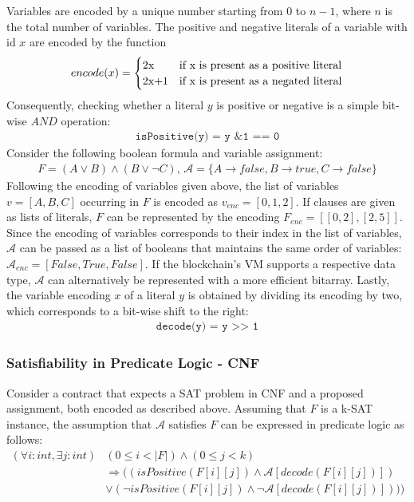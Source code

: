 Variables are encoded by a unique number starting from $0$ to $n-1$, where $n$ is the total number of variables. The positive and negative literals of a variable with id $x$ are encoded by the function
\begin{align*}
encode(x) =
\begin{cases}
  $2x$  & \text{if x is present as a positive literal}\\
  $2x+1$ & \text{if x is present as a negated literal}\\
\end{cases}   
\end{align*}
Consequently, checking whether a literal $y$ is positive or negative is a simple bit-wise $AND$ operation:
\begin{align*}
\texttt{isPositive(y) = y \& 1 == 0}
\end{align*}
Consider the following boolean formula and variable assignment:
\begin{align*}
F = (A \vee B) \wedge (B \vee \neg C) \text{, } \mathcal{A} = \{A \rightarrow false, B \rightarrow true, C \rightarrow false\}
\end{align*}
Following the encoding of variables given above, the list of variables $v=[A,B,C]$ occurring in $F$ is encoded as $v_{enc} = [0,1,2]$. If clauses are given as lists of literals, $F$ can be represented by the encoding $F_{enc} = [[0,2],[2,5]]$. Since the encoding of variables corresponds to their index in the list of variables, $\mathcal{A}$ can be passed as a list of booleans that maintains the same order of variables: $\mathcal{A}_{enc} = [False, True, False]$. If the blockchain's VM supports a respective data type, $\mathcal{A}$ can alternatively be represented with a more efficient bitarray. Lastly, the variable encoding $x$ of a literal $y$ is obtained by dividing its encoding by two, which corresponds to a bit-wise shift to the right:
\begin{align*}
\texttt{decode(y) = y >> 1}
\end{align*}

\subsubsection{Satisfiability in Predicate Logic - CNF}
Consider a contract that expects a SAT problem in CNF and a proposed assignment, both encoded as described above. Assuming that $F$ is a k-SAT instance, the assumption that $\mathcal{A}$ satisfies $F$ can be expressed in predicate logic as follows:
\begin{equation}\label{eq:cnf_sat}
\begin{aligned}
(\forall i : int, \exists j : int) &(0 \leq i < |F|) \wedge (0 \leq j < k) \\
&\Rightarrow ((isPositive(F[i][j]) \wedge \mathcal{A}[decode(F[i][j])]) \\
&\vee (\neg isPositive(F[i][j]) \wedge \neg \mathcal{A}[decode(F[i][j])])))
\end{aligned}
\end{equation}


